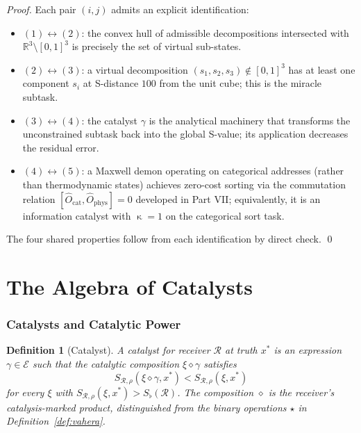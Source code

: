 \documentclass[twocolumn,a4paper]{article}
\newtheorem{definition}[theorem]{Definition}
\DeclareMathOperator{\catpow}{\kappa}
\newcommand{\Real}{\mathbb{R}}
\newcommand{\Expr}{\mathcal{E}}
\newcommand{\receiver}{\mathcal{R}}
\newcommand{\Sscalar}{S}
\newcommand{\Sfloor}{S_{\flat}}
\newcommand{\Ocat}{\hat{O}_{\mathrm{cat}}}
\newcommand{\Ophys}{\hat{O}_{\mathrm{phys}}}
\begin{document}
\begin{proof}
Each pair $(i,j)$ admits an explicit identification:
\begin{itemize}[nosep,leftmargin=*]
\item $(1)\leftrightarrow(2)$: the convex hull of admissible decompositions intersected with $\Real^{3}\setminus[0,1]^{3}$ is precisely the set of virtual sub-states.
\item $(2)\leftrightarrow(3)$: a virtual decomposition $(s_{1},s_{2},s_{3})\notin[0,1]^{3}$ has at least one component $s_{i}$ at S-distance $100$ from the unit cube; this is the miracle subtask.
\item $(3)\leftrightarrow(4)$: the catalyst $\gamma$ is the analytical machinery that transforms the unconstrained subtask back into the global S-value; its application decreases the residual error.
\item $(4)\leftrightarrow(5)$: a Maxwell demon operating on categorical addresses (rather than thermodynamic states) achieves zero-cost sorting via the commutation relation $[\Ocat,\Ophys]=0$ developed in Part VII; equivalently, it is an information catalyst with $\catpow=1$ on the categorical sort task.
\end{itemize}
The four shared properties follow from each identification by direct check. \qed
\end{proof}

\part{The Algebra of Catalysts}

\section{Catalysts and Catalytic Power}
\label{sec:catalysts}

\begin{definition}[Catalyst]
\label{def:catalyst}
A \emph{catalyst} for receiver $\receiver$ at truth $x^{*}$ is an expression $\gamma\in\Expr$ such that the catalytic composition $\xi\diamond\gamma$ satisfies
\[
\Sscalar_{\receiver,\rho}(\xi\diamond\gamma,x^{*})<\Sscalar_{\receiver,\rho}(\xi,x^{*})
\]
for every $\xi$ with $\Sscalar_{\receiver,\rho}(\xi,x^{*})>\Sfloor(\receiver)$. The composition $\diamond$ is the receiver's catalysis-marked product, distinguished from the binary operations $\star$ in Definition~\ref{def:vahera}.
\end{definition}
\end{document}
